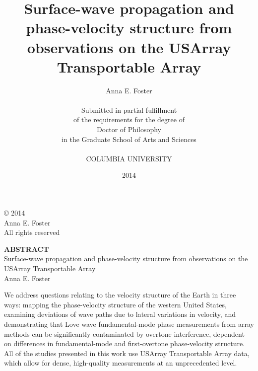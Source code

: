 \documentclass[12pt,oneside]{book}
\date{2014}                                           %
\newenvironment{bottompar}{\par\vspace*{\fill}}{\clearpage}
\begin{document}
\begin{titlepage}
\singlespacing
\title{Surface-wave propagation and phase-velocity structure from observations on the USArray Transportable Array}
\author{Anna E. Foster \\
\vspace{272pt}\\
Submitted in partial fulfillment \\
of the requirements
for the degree of \\
Doctor of Philosophy \\
in the Graduate School of Arts and Sciences \\
\vspace{24pt}\\
COLUMBIA UNIVERSITY \\}
\maketitle
\end{titlepage}

\vspace{10cm}
\singlespacing
\null
\begin{center}
\begin{bottompar}
{\large \copyright  \hspace{1mm} 2014 \\
Anna E. Foster\\
All rights reserved}
\end{bottompar}

\doublespacing
\large
{\bf ABSTRACT}\\
Surface-wave propagation and phase-velocity structure from observations on the USArray Transportable Array\\
Anna E. Foster
\end{center}
\doublespacing

We address questions relating to the velocity structure of the Earth in three ways: mapping the phase-velocity structure of the western United States, examining deviations of wave paths due to lateral variations in velocity, and demonstrating that Love wave fundamental-mode phase measurements from array methods can be significantly contaminated by overtone interference, dependent on differences in fundamental-mode and first-overtone phase-velocity structure. All of the studies presented in this work use USArray Transportable Array data, which allow for dense, high-quality measurements at an unprecedented level. 
\end{document}
